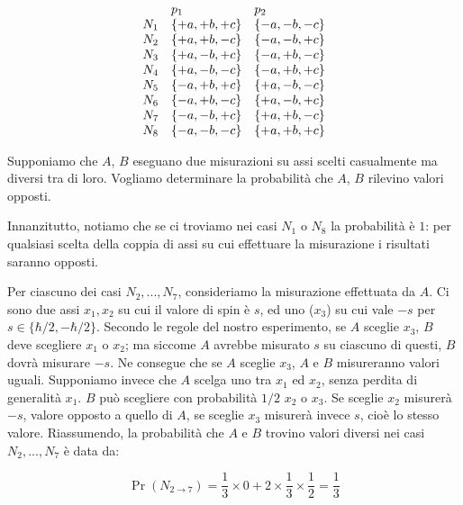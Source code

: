 	\begin{equation}
		\begin{array} {l l l}
				& p_1 & p_2 \\
			N_1 & \{ +a, +b, +c \} & \{ -a, -b, -c \} \\
			N_2 & \{ +a, +b, -c \} & \{ -a, -b, +c \} \\
			N_3 & \{ +a, -b, +c \} & \{ -a, +b, -c \} \\
			N_4 & \{ +a, -b, -c \} & \{ -a, +b, +c \} \\
			N_5 & \{ -a, +b, +c \} & \{ +a, -b, -c \} \\
			N_6 & \{ -a, +b, -c \} & \{ +a, -b, +c \} \\
			N_7 & \{ -a, -b, +c \} & \{ +a, +b, -c \} \\
			N_8 & \{ -a, -b, -c \} & \{ +a, +b, +c \} \\
		\end{array}
	\end{equation}

Supponiamo che $A$, $B$ eseguano due misurazioni su assi scelti casualmente ma diversi tra di loro. Vogliamo determinare la probabilit\`a che $A$, $B$ rilevino valori opposti.

Innanzitutto, notiamo che se ci troviamo nei casi $N_1$ o $N_8$ la probabilit\`a \`e $1$: per qualsiasi scelta della coppia di assi su cui effettuare la misurazione i risultati saranno opposti.

Per ciascuno dei casi $N_2, ..., N_7$, consideriamo la misurazione effettuata da $A$. Ci sono due assi $x_1, x_2$ su cui il valore di spin \`e $s$, ed uno ($x_3$) su cui vale $-s$ per $s \in \{ \hbar/2, -\hbar/2 \}$. Secondo le regole del nostro esperimento, se $A$ sceglie $x_3$, $B$ deve scegliere $x_1$ o $x_2$; ma siccome $A$ avrebbe misurato $s$ su ciascuno di questi, $B$ dovr\`a misurare $-s$. Ne consegue che se $A$ sceglie $x_3$, $A$ e $B$ misureranno valori uguali. Supponiamo invece che $A$ scelga uno tra $x_1$ ed $x_2$, senza perdita di generalit\`a $x_1$. $B$ pu\`o scegliere con probabilit\`a $1/2$ $x_2$ o $x_3$. Se sceglie $x_2$ misurer\`a $-s$, valore opposto a quello di $A$, se sceglie $x_3$ misurer\`a invece $s$, cio\`e lo stesso valore. Riassumendo, la probabilit\`a che $A$ e $B$ trovino valori diversi nei casi $N_2, ..., N_7$ \`e data da:

	\begin{equation}
		\Pr(N_{2 \rightarrow 7}) = \frac{1}{3} \times 0 + 2 \times \frac{1}{3} \times \frac{1}{2} = \frac{1}{3}
	\end{equation}


